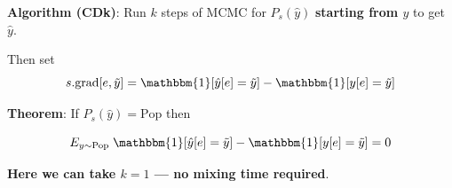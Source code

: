 {  
{\bf Algorithm (CDk)}: Run $k$ steps of MCMC for $P_s(\hat{y})$ {\bf starting from $y$} to get $\hat{y}$.

\vfill
Then set
$$s.\mathrm{grad}[e,\tilde{y}] = \mathbbm{1}[\hat{y}[e] = \tilde{y}] - \mathbbm{1}[y[e]= \tilde{y}]$$

\vfill
    {\bf Theorem}: If $P_s(\hat{y}) = \mathrm{Pop}$ then
    
    $$E_{y \sim \mathrm{Pop}}\; \mathbbm{1}[\hat{y}[e] = \tilde{y}] - \mathbbm{1}[y[e]= \tilde{y}] = 0$$

\vfill
{\bf Here we can take $k=1$ --- \bf no mixing time required}.



}


